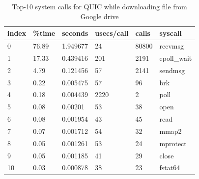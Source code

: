 \begin{frame}

\begin{table}[ht]
    \begin{tabular}{@{}|l|l|l|l|l|l|@{}}
        \toprule
        \textbf{index} & \textbf{\%time} & \textbf{seconds} & \textbf{usecs/call} & \textbf{calls} & \textbf{syscall} \\ \midrule
        0              & 76.89           & 1.949677         & 24                  & 80800          & recvmsg          \\ \midrule
        1              & 17.33           & 0.439416         & 201                 & 2191           & epoll\_wait      \\ \midrule
        2              & 4.79            & 0.121456         & 57                  & 2141           & sendmsg          \\ \midrule
        3              & 0.22            & 0.005475         & 57                  & 96             & brk              \\ \midrule
        4              & 0.18            & 0.004439         & 2220                & 2              & poll             \\ \midrule
        5              & 0.08            & 0.00201          & 53                  & 38             & open             \\ \midrule
        6              & 0.08            & 0.001954         & 43                  & 45             & read             \\ \midrule
        7              & 0.07            & 0.001712         & 54                  & 32             & mmap2            \\ \midrule
        8              & 0.05            & 0.001261         & 53                  & 24             & mprotect         \\ \midrule
        9              & 0.05            & 0.001185         & 41                  & 29             & close            \\ \midrule
        10             & 0.03            & 0.000878         & 38                  & 23             & fstat64          \\ \bottomrule
    \end{tabular}
    \caption{Top-10 system calls for QUIC while downloading file from Google drive}\label{table:top-10-system-calls}
\end{table}

\end{frame}
\clearpage

